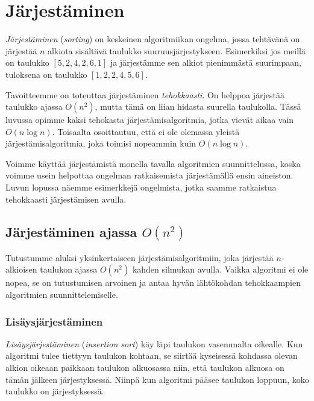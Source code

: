 \chapter{Järjestäminen}


\emph{Järjestäminen} (\emph{sorting}) on keskeinen algoritmiikan ongelma,
jossa tehtävänä on jär\-jestää $n$ alkiota sisältävä
taulukko suuruusjärjestykseen.
Esimerkiksi jos meil\-lä on taulukko $[5,2,4,2,6,1]$ ja
järjestämme sen alkiot pienimmästä suurimpaan,
tuloksena on taulukko $[1,2,2,4,5,6]$.

Tavoitteemme on toteuttaa järjestäminen
\emph{tehokkaasti}.
On helppoa järjes\-tää taulukko ajassa $O(n^2)$,
mutta tämä on liian hidasta suurella taulukolla.
Tässä luvussa opimme kaksi tehokasta
järjestämisalgoritmia, jotka vievät aikaa vain $O(n \log n)$.
Toisaalta osoittautuu, että ei ole olemassa
yleistä järjestämisalgoritmia, joka toimisi nopeammin
kuin $O(n \log n)$.

Voimme käyttää järjestämistä monella tavalla
algoritmien suunnittelussa,
koska voimme usein helpottaa ongelman ratkaisemista
järjestämällä ensin aineiston.
Luvun lopussa näemme esimerkkejä ongelmista,
jotka saamme ratkaistua tehokkaasti järjestämisen avulla.

\section{Järjestäminen ajassa $O(n^2)$}


Tutustumme aluksi yksinkertaiseen järjestämisalgoritmiin,
joka järjestää $n$-alkioisen taulukon ajassa $O(n^2)$ kahden silmukan avulla.
Vaikka algoritmi ei ole nopea, se on tutustumisen arvoinen
ja antaa hyvän lähtökohdan tehokkaampien algoritmien
suunnittelemiselle.

\subsection{Lisäysjärjestäminen}

\emph{Lisäysjärjestäminen} (\emph{insertion sort}) käy läpi taulukon
vasemmalta oikealle.
Kun algoritmi tulee tiettyyn taulukon kohtaan,
se siirtää kyseisessä kohdassa olevan alkion
oikeaan paikkaan taulukon
alkuosassa niin, että taulukon alkuosa
on tämän jälkeen järjestyksessä.
Niinpä kun algoritmi pääsee taulukon loppuun,
koko taulukko on järjestyksessä.

